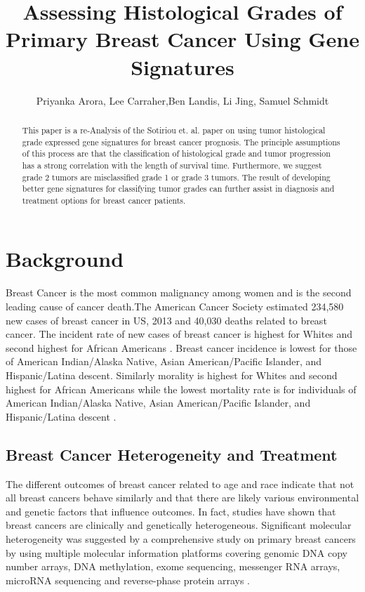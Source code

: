 \documentclass[a4paper,10pt]{article}
\title{Assessing Histological Grades of Primary Breast Cancer Using Gene Signatures}
\author{Priyanka Arora, Lee Carraher,Ben Landis, Li Jing, Samuel Schmidt}
\begin{document}
\maketitle

\begin{abstract}
This paper is a re-Analysis of the Sotiriou et. al. paper on using tumor 
histological grade expressed gene signatures for breast cancer 
prognosis\cite{Sotiriou}. The principle assumptions of this process are that
the classification of histological grade and tumor progression has a strong 
correlation with the length of survival time. Furthermore, we suggest grade 2
tumors are misclassified grade 1 or grade 3 tumors. The result of developing 
better gene signatures for classifying tumor grades can further
assist in diagnosis and treatment options for breast cancer patients.


\end{abstract}


\section{Background}   
Breast Cancer is the most common malignancy among women and is the second 
leading cause of cancer death.The American Cancer Society estimated 234,580 new 
cases of breast cancer in US, 2013 and 40,030 deaths related to breast cancer. 
The incident rate of new cases of breast cancer is highest 
for Whites and second highest for African Americans \cite{henderson1}.  Breast cancer incidence is lowest for those of American Indian/Alaska Native, 
Asian American/Pacific Islander, and Hispanic/Latina descent.  Similarly morality is 
highest for Whites and second highest for African Americans while the lowest mortality 
rate is for individuals of American Indian/Alaska Native, Asian American/Pacific Islander, 
and Hispanic/Latina descent \cite{henderson1}. \\
\subsection{Breast Cancer Heterogeneity and Treatment} 
The different outcomes of breast cancer related to age and race indicate that not all 
breast cancers behave similarly and that there are likely various environmental and 
genetic factors that influence outcomes.  In fact, studies have shown that breast 
cancers are clinically and genetically heterogeneous\cite{desantis1}. Significant 
molecular heterogeneity was suggested by a comprehensive study on primary breast 
cancers by using multiple molecular information platforms covering genomic DNA 
copy number arrays, DNA methylation, exome sequencing, messenger RNA arrays, 
microRNA sequencing and reverse-phase protein arrays \cite{Nature1}. \\
\end{document}
